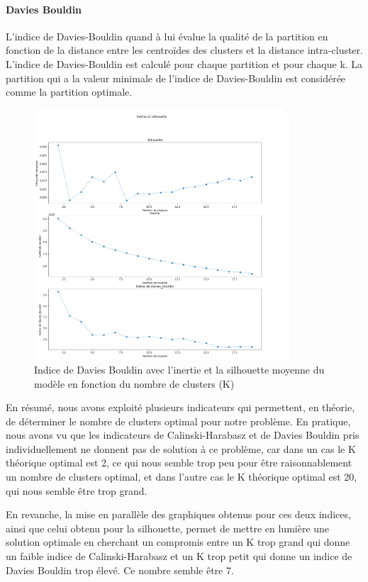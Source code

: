 \documentclass{article}
\begin{document}
\paragraph{Davies Bouldin} L'indice de Davies-Bouldin quand à lui évalue la qualité de la partition en fonction de la distance entre les centroïdes des clusters et la distance intra-cluster. L'indice de Davies-Bouldin est calculé pour chaque partition et pour chaque k. La partition qui a la valeur minimale de l'indice de Davies-Bouldin est considérée comme la partition optimale.

\begin{figure}[H]
	\centering
	\includegraphics[width=0.85\textwidth]{"./Images/DB.png"}
	\caption{\centering Indice de Davies Bouldin avec l'inertie et la silhouette moyenne du modèle en fonction du nombre de clusters (K)}
	\label{fig:DB}
\end{figure}

En résumé, nous avons exploité plusieurs indicateurs qui permettent, en théorie, de déterminer le nombre de clusters optimal pour notre problème. En pratique, nous avons vu que les indicateurs de Calinski-Harabasz et de Davies Bouldin pris individuellement ne donnent pas de solution à ce problème, car dans un cas le K théorique optimal est 2, ce qui nous semble trop peu pour être raisonnablement un nombre de clusters optimal, et dans l'autre cas le K théorique optimal est 20, qui nous semble être trop grand.

En revanche, la mise en parallèle des graphiques obtenus pour ces deux indices, ainsi que celui obtenu pour la silhouette, permet de mettre en lumière une solution optimale en cherchant un compromis entre un K trop grand qui donne un faible indice de Calinski-Harabasz et un K trop petit qui donne un indice de Davies Bouldin trop élevé. Ce nombre semble être 7.
\end{document}
